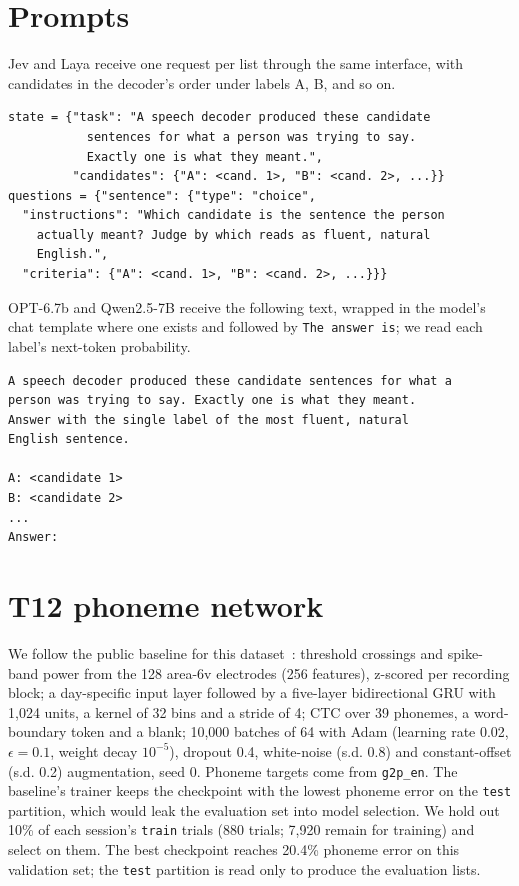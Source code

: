 \section{Prompts}
\label{app:prompt}

Jev and Laya receive one request per list through the same interface, with candidates in the
decoder's order under labels A, B, and so on.

{\scriptsize
\begin{verbatim}
state = {"task": "A speech decoder produced these candidate
           sentences for what a person was trying to say.
           Exactly one is what they meant.",
         "candidates": {"A": <cand. 1>, "B": <cand. 2>, ...}}
questions = {"sentence": {"type": "choice",
  "instructions": "Which candidate is the sentence the person
    actually meant? Judge by which reads as fluent, natural
    English.",
  "criteria": {"A": <cand. 1>, "B": <cand. 2>, ...}}}
\end{verbatim}}

OPT-6.7b and Qwen2.5-7B receive the following text, wrapped in the model's chat template where one
exists and followed by \texttt{The answer is}; we read each label's next-token probability.

{\scriptsize
\begin{verbatim}
A speech decoder produced these candidate sentences for what a
person was trying to say. Exactly one is what they meant.
Answer with the single label of the most fluent, natural
English sentence.

A: <candidate 1>
B: <candidate 2>
...
Answer:
\end{verbatim}}

\section{T12 phoneme network}
\label{app:t12}

We follow the public baseline for this dataset~\citep{b2t24}: threshold crossings and spike-band
power from the 128 area-6v electrodes (256 features), z-scored per recording block; a day-specific
input layer followed by a five-layer bidirectional GRU with 1,024 units, a kernel of 32 bins and a
stride of 4; CTC over 39 phonemes, a word-boundary token and a blank; 10,000 batches of 64 with Adam
(learning rate 0.02, $\epsilon = 0.1$, weight decay $10^{-5}$), dropout 0.4, white-noise (s.d. 0.8)
and constant-offset (s.d. 0.2) augmentation, seed 0. Phoneme targets come from \texttt{g2p\_en}.
The baseline's trainer keeps the checkpoint with the lowest phoneme error on the \texttt{test}
partition, which would leak the evaluation set into model selection. We hold out 10\% of each
session's \texttt{train} trials (880 trials; 7,920 remain for training) and select on them. The best
checkpoint reaches 20.4\% phoneme error on this validation set; the \texttt{test} partition is read
only to produce the evaluation lists.

